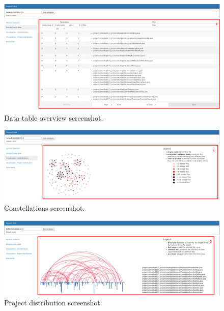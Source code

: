 \documentclass{uva-inf-article}
\begin{document}
\begin{figure}[!htb]
	\includegraphics[width=\textwidth]{visualization2}
	\centering
	\caption{Data table overview screenshot.}
	\label{screenshot2}
\end{figure}

\begin{figure}[!htb]
	\includegraphics[width=\textwidth]{visualization3}
	\centering
	\caption{Constellations screenshot.}
	\label{screenshot3}
\end{figure}

\begin{figure}[!htb]
	\includegraphics[width=\textwidth]{visualization4}
	\centering
	\caption{Project distribution screenshot.}
	\label{screenshot4}
\end{figure}
\end{document}
